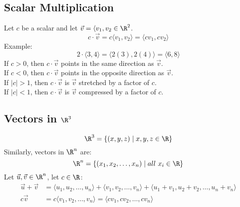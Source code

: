 \documentclass{math}
\begin{document}
\subsection*{Scalar Multiplication}
Let \( c \) be a scalar and let \( \vec{v} = \langle v_1,v_2\in\R^2 \).
\[ c\cdot\vec{v} = c\langle v_1,v_2\rangle = \langle cv_1,cv_2\rangle \]
Example:
\[ 2\cdot\langle3,4\rangle = \langle2(3),2(4)\rangle = \langle6,8\rangle \]
If \( c>0 \), then \( c\cdot\vec{v} \) points in the same direction as
\( \vec{v} \). \\
If \( c<0 \), then \( c\cdot\vec{v} \) points in the opposite
direction as \( \vec{v} \). \\
If \( |c|>1 \), then \( c\cdot\vec{v} \) is \( \vec{v} \) stretched by a factor
of \( c \). \\
If \( |c|<1 \), then \( c\cdot\vec{v} \) is \( \vec{v} \) compressed by a factor
of \( c \).

\subsection*{Vectors in \( \R^3 \)}
\[ \R^3 = \{(x,y,z)\mid x,y,z\in\R\} \]
Similarly, vectors in \( \R^n \) are:
\[ \R^n = \{(x_1,x_2,\dots,x_n)\mid all\ x_i\in\R\} \]
Let \( \vec{u},\vec{v}\in\R^n \), let \( c\in\R \):
\begin{align*}
  \vec{u}+\vec{v} &= \langle u_1,u_2,\dots,u_n\rangle +
    \langle v_1,v_2,\dots,v_n\rangle +
    \langle u_1+v_1,u_2+v_2,\dots,u_n+v_n\rangle \\
  c\vec{v} &= c\langle v_1,v_2,\dots,v_n\rangle =
    \langle cv_1,cv_2,\dots,cv_n\rangle
\end{align*}
\end{document}
